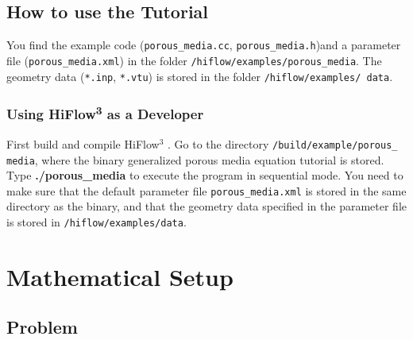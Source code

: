 \documentclass{article}
\newcommand{\HiFlow}{HiFlow\texorpdfstring{\textsuperscript{3} }{3 }}
\begin{document}
\subsection{How to use the Tutorial}

You find the example code (\texttt{porous\_media.cc}, \texttt{porous\_media.h})and a
parameter file (\texttt{porous\_media.xml}) in the folder
\texttt{/hiflow/examples/porous\_media}. The geometry data (\texttt{*.inp}, \texttt{*.vtu}) is stored in the
folder \texttt{/hiflow/examples/ data}.



% 

\subsubsection{Using \HiFlow as a Developer}

First build and compile  HiFlow$^\text{3}$ . Go to the directory \texttt{/build/example/porous\_ media}, where the binary generalized porous media equation tutorial is stored. Type \newline\mbox{\textbf{./porous\_media}} to execute the program in sequential mode. You need to make sure that the default parameter file \texttt{porous\_media.xml} is stored in the same directory as the binary, and that the geometry data specified in the parameter file is stored in \texttt{/hiflow/examples/data}.

\pagebreak

\section{Mathematical Setup}
\label{ch:mathSetup}

\subsection{Problem}
\end{document}
